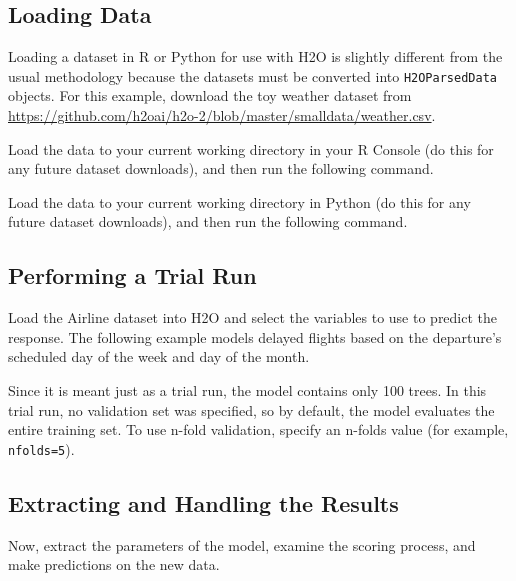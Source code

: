 \subsection{Loading Data}

Loading a dataset in R or Python for use with H2O is slightly different from the usual methodology because the datasets must be converted into \texttt{H2OParsedData} objects. For this example, download the toy weather dataset from
{\url{https://github.com/h2oai/h2o-2/blob/master/smalldata/weather.csv}}.


\waterExampleInR
Load the data to your current working directory in your R Console (do this for any future dataset downloads), and then run the following command.


\medskip
\waterExampleInPython
Load the data to your current working directory in Python (do this for any future dataset downloads), and then run the following command.




\subsection{Performing a Trial Run}
Load the Airline dataset into H2O and select the variables to use to predict  the response. The following example models delayed flights based on the departure's scheduled day of the week and day of the month.

\waterExampleInR



\waterExampleInPython



Since it is meant just as a trial run, the model contains only 100 trees. In this trial run, no validation set was
specified, so by default, the model evaluates the entire training set.  To use n-fold validation, specify an n-folds value (for example, \texttt{nfolds=5}).

\subsection{Extracting and Handling the Results}

Now, extract the parameters of the model, examine the scoring process, and make predictions on the new data.

\begin{minipage}{\textwidth}

\waterExampleInR

\end{minipage}

